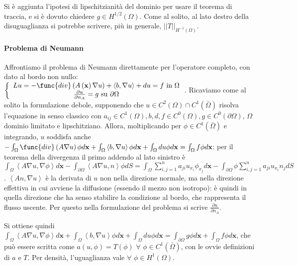 \documentclass{article}
\begin{document}
Si \`{e} aggiunta l'ipotesi di lipschitzianit\`{a} del dominio per usare il
teorema di traccia, e si \`{e} dovuto chiedere $g\in H^{1/2}\left( \Omega
\right) $. Come al solito, al lato destro della disuguaglianza si potrebbe
scrivere, pi\`{u} in generale, $\left\vert \left\vert T\right\vert
\right\vert _{H^{-1}\left( \Omega \right) }$.

\paragraph{Problema di Neumann}

Affrontiamo il problema di Neumann direttamente per l'operatore completo,
con dato al bordo non nullo: $\left\{ 
\begin{array}{c}
Lu=-\func{div}\left( A\left( \mathbf{x}\right) \nabla u\right) +\left\langle
b,\nabla u\right\rangle +du=f\text{ in }\Omega \\ 
\frac{\partial u}{\partial n_{A}}=g\text{ su }\partial \Omega%
\end{array}%
\right. $. Ricaviamo come al solito la formulazione debole, supponendo che $%
u\in C^{2}\left( \Omega \right) \cap C^{1}\left( \bar{\Omega}\right) $
risolva l'equazione in senso classico con $a_{ij}\in C^{1}\left( \Omega
\right) ,b,d,f\in C^{0}\left( \Omega \right) ,g\in C^{0}\left( \partial
\Omega \right) $, $\Omega $ dominio limitato e lipschitziano. Allora,
moltiplicando per $\phi \in C^{1}\left( \bar{\Omega}\right) $ e integrando, $%
u$ soddisfa anche $-\int_{\Omega }\func{div}\left( A\nabla u\right) \phi d%
\mathbf{x}+\int_{\Omega }\left\langle b,\nabla u\right\rangle \phi d\mathbf{x%
}+\int_{\Omega }du\phi d\mathbf{x}=\int_{\Omega }f\phi d\mathbf{x}$: per il
teorema della divergenza il primo addendo al lato sinistro \`{e} $%
\int_{\Omega }\left\langle A\nabla u,\nabla \phi \right\rangle d\mathbf{x-}%
\int_{\partial \Omega }\left\langle A\nabla u,n\right\rangle \phi
dS=\int_{\Omega }\sum_{i,j=1}^{n}a_{ji}u_{x_{i}}\phi _{x_{j}}d\mathbf{x}%
-\int_{\partial \Omega }\phi \sum_{i,j=1}^{n}a_{ji}u_{x_{i}}n_{j}dS$. $\left\langle An,\nabla u\right\rangle $ \`{e} la
derivata di $u$ non nella direzione normale, ma nella direzione effettiva in
cui avviene la diffusione (essendo il mezzo non isotropo): \`{e} quindi in
quella direzione che ha senso stabilire la condizione al bordo, che
rappresenta il flusso uscente. Per questo nella formulazione del problema si
scrive $\frac{\partial u}{\partial n_{A}}$.

Si ottiene quindi $\int_{\Omega }\left\langle A\nabla u,\nabla \phi
\right\rangle d\mathbf{x}+\int_{\Omega }\left\langle b,\nabla u\right\rangle
\phi d\mathbf{x}+\int_{\Omega }du\phi d\mathbf{x}=\int_{\partial \Omega
}g\phi d\mathbf{x}+\int_{\Omega }f\phi d\mathbf{x}$, che pu\`{o} essere
scritta come $a\left( u,\phi \right) =T\left( \phi \right) $ $\forall $ $%
\phi \in C^{1}\left( \bar{\Omega}\right) $, con le ovvie definizioni di $a$
e $T$. Per densit\`{a}, l'uguaglianza vale $\forall $ $\phi \in H^{1}\left(
\Omega \right) $.
\end{document}
